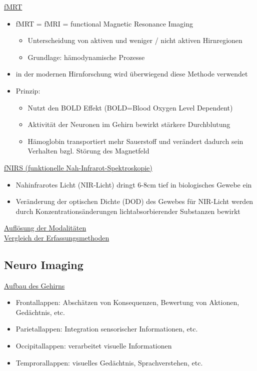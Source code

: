 \documentclass[a4paper,10pt,oneside]{article}
\begin{document}
\underline{fMRT} \\
	\begin{itemize}
		\item fMRT = fMRI = functional Magnetic Resonance Imaging
			\begin{itemize}
				\item Unterscheidung von aktiven und weniger / nicht aktiven Hirnregionen
				\item Grundlage: hämodynamische Prozesse
			\end{itemize}
		\item in der modernen Hirnforschung wird überwiegend diese Methode verwendet 
		\item Prinzip:
			\begin{itemize}
				\item Nutzt den BOLD Effekt (BOLD=Blood Oxygen Level Dependent)
				\item Aktivität der Neuronen im Gehirn bewirkt stärkere Durchblutung 
				\item Hämoglobin transportiert mehr Sauerstoff und verändert dadurch sein Verhalten bzgl. Störung des Magnetfeld
			\end{itemize}
	\end{itemize}
	
\underline{fNIRS (funktionelle Nah-Infrarot-Spektroskopie)} \\
	\begin{itemize}
		\item Nahinfrarotes Licht (NIR-Licht) dringt 6-8cm tief in biologisches Gewebe ein
		\item Veränderung der optischen Dichte (DOD) des Gewebes für NIR-Licht werden durch Konzentrationsänderungen lichtabsorbierender Substanzen bewirkt 
	\end{itemize}

\underline{Auflösung der Modalitäten} \\

\underline{Vergleich der Erfassungsmethoden} \\

\subsection{Neuro Imaging}

\underline{Aufbau des Gehirns} \\

	\begin{itemize}
		\item Frontallappen: Abschätzen von Konsequenzen, Bewertung von Aktionen, Gedächtnis, etc.
		\item Parietallappen: Integration sensorischer Informationen, etc.
		\item Occipitallappen: verarbeitet visuelle Informationen
		\item Temprorallappen: visuelles Gedächtnis, Sprachverstehen, etc.
	\end{itemize}
	
\end{document}
